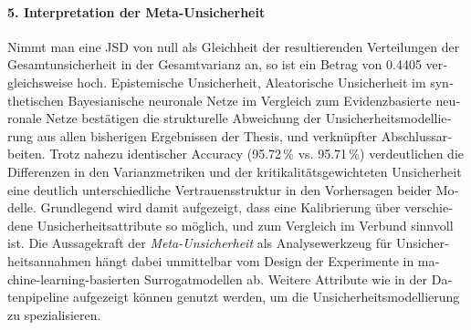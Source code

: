 \begin{otherlanguage}{ngerman}
\paragraph{5. Interpretation der Meta-Unsicherheit} Nimmt man eine JSD von null als Gleichheit der resultierenden Verteilungen der Gesamtunsicherheit in der Gesamtvarianz an, so ist ein Betrag von 0.4405 vergleichsweise hoch. \gls{Epistemische Unsicherheit}, \gls{Aleatorische Unsicherheit} im synthetischen \gls{Bayesianische neuronale Netze} im Vergleich zum \gls{Evidenzbasierte neuronale Netze} bestätigen die strukturelle Abweichung der Unsicherheitsmodellierung aus allen bisherigen Ergebnissen der Thesis, und verknüpfter Abschlussarbeiten. Trotz nahezu identischer Accuracy (95.72\,\% vs. 95.71\,\%) verdeutlichen die Differenzen in den Varianzmetriken und der kritikalitätsgewichteten Unsicherheit eine deutlich unterschiedliche Vertrauensstruktur in den Vorhersagen beider Modelle. Grundlegend wird damit aufgezeigt, dass eine Kalibrierung über verschiedene Unsicherheitsattribute so möglich, und zum Vergleich im Verbund sinnvoll ist. Die Aussagekraft der \textit{Meta-Unsicherheit} als Analysewerkzeug für Unsicherheitsannahmen hängt dabei unmittelbar vom Design der Experimente in machine-learning-basierten Surrogatmodellen ab. Weitere Attribute wie in der Datenpipeline aufgezeigt können genutzt werden, um die Unsicherheitsmodellierung zu spezialisieren.



\end{otherlanguage}
